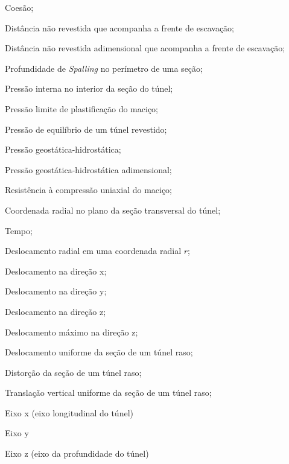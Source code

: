 
\item[$c$]				Coesão;
\item[$d_0$]			Distância não revestida que acompanha a frente de escavação;
\item[$d_0^*$]			Distância não revestida adimensional que acompanha a frente de escavação;
\item[$h_s$]			Profundidade de \textit{Spalling} no perímetro de uma seção;
\item[$ p_i $]			Pressão interna no interior da seção do túnel;
\item[$ p_{lim} $] 		Pressão limite de plastificação do maciço;
\item[$ p_{eq} $] 		Pressão de equilíbrio de um túnel revestido;
\item[$ p_\infty $]		Pressão geostática-hidrostática;
\item[$ p_\infty^* $]	Pressão geostática-hidrostática adimensional;
\item[$ q_0 $] 			Resistência à compressão uniaxial do maciço;
\item[$ r $]			Coordenada radial no plano da seção transversal do túnel;
\item[$ t $] 			Tempo;
\item[$ u(r) $] 		Deslocamento radial em uma coordenada radial $r$;
\item[$ u_x $] 			Deslocamento na direção x;
\item[$ u_y $] 			Deslocamento na direção y;
\item[$ u_z $] 			Deslocamento na direção z;
\item[$ u_{z_{max}} $] 	Deslocamento máximo na direção z;
\item[$ u_\varepsilon $] Deslocamento uniforme da seção de um túnel raso;
\item[$ u_\delta $] 	 Distorção da seção de um túnel raso;
\item[$ \Delta u_y $] 	 Translação vertical uniforme da seção de um túnel raso;
\item[$x$]				Eixo x (eixo longitudinal do túnel)
\item[$y$]				Eixo y
\item[$z$]				Eixo z (eixo da profundidade do túnel)

